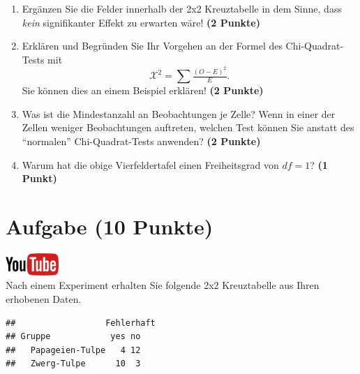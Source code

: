\documentclass[a4paper, 9pt]{scrartcl}\usepackage[]{graphicx}\usepackage[]{xcolor}
\makeatletter
\newenvironment{kframe}{%
 \def\at@end@of@kframe{}%
 \ifinner\ifhmode%
  \def\at@end@of@kframe{\end{minipage}}%
  \begin{minipage}{\columnwidth}%
 \fi\fi%
 \def\FrameCommand##1{\hskip\@totalleftmargin \hskip-\fboxsep
 \colorbox{shadecolor}{##1}\hskip-\fboxsep
     \hskip-\linewidth \hskip-\@totalleftmargin \hskip\columnwidth}%
 \MakeFramed {\advance\hsize-\width
   \@totalleftmargin\z@ \linewidth\hsize
   \@setminipage}}%
 {\par\unskip\endMakeFramed%
 \at@end@of@kframe}
\newenvironment{knitrout}{}{} %
\makeatother
\begin{document}
\begin{enumerate}
\item Erg{\"a}nzen Sie die Felder innerhalb der 2x2 Kreuztabelle in dem Sinne,
  dass \textit{kein} signifikanter Effekt zu erwarten w{\"a}re!
  \textbf{(2 Punkte)}
\item Erkl{\"a}ren und Begr{\"u}nden Sie Ihr Vorgehen an der Formel des
  Chi-Quadrat-Tests mit
  \begin{equation*}
  \mathcal{X}^2 = \sum\tfrac{(O - E)^2}{E}.  
  \end{equation*}
  Sie k{\"o}nnen dies an einem Beispiel erkl{\"a}ren! \textbf{(2 Punkte)}
\item Was ist die Mindestanzahl an Beobachtungen je Zelle? Wenn in einer
  der Zellen weniger Beobachtungen auftreten, welchen Test k{\"o}nnen Sie
  anstatt des "`normalen"' Chi-Quadrat-Tests anwenden? \textbf{(2 Punkte)}
\item Warum hat die obige Vierfeldertafel einen Freiheitsgrad von $df=1$?
  \textbf{(1 Punkt)}
\end{enumerate} 
\clearpage

\section{Aufgabe \hfill (10 Punkte)}

\hfill\href{https://youtu.be/ghArbetOr_E}{\includegraphics[width =
  2cm]{img/youtube}}\\[1Ex]

Nach einem Experiment erhalten Sie folgende 2x2 Kreuztabelle aus Ihren
erhobenen Daten.

\begin{knitrout}
\color{fgcolor}\begin{kframe}
\begin{verbatim}
##                  Fehlerhaft
## Gruppe            yes no
##   Papageien-Tulpe   4 12
##   Zwerg-Tulpe      10  3
\end{verbatim}
\end{kframe}
\end{knitrout}
\end{document}
